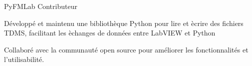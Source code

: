 
\begin{cventries}

  \cventry
    {PyFMLab}
    {Contributeur}
    {}
    {}
    {
      \begin{cvitems}
        \item{D\'evelopp\'e et maintenu une biblioth\`eque Python pour lire et \`ecrire des fichiers TDMS, facilitant les \`echanges de donn\'ees entre LabVIEW et Python}
        \item{Collabor\'e avec la communaut\'e open source pour am\'eliorer les fonctionnalit\'es et l'utilisabilit\'e.}
      \end{cvitems}
    }

\end{cventries}
